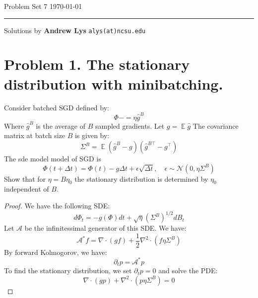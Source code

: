 \documentclass{amsart}
\newcommand{\cA}{\mathcal{A}}
\newcommand{\cN}{\mathcal{N}}
\DeclareMathOperator{\ee}{\mathbb{E}}
\theoremstyle{definition}
\begin{document}
\noindent
Problem Set 7  \hfill \today  %
\smallskip
\hrule
\smallskip
\noindent
Solutions by {\bf Andrew Lys} \qquad   %
  {\tt alys(at)ncsu.edu}

\vspace{0.5cm}

\section*{Problem 1. The stationary distribution with minibatching.}
Consider batched SGD defined by:
\[
\Phi -= \eta \hat{g}^B
\]
Where $\hat{g}^B$ is the average of $B$ sampled gradients. 
Let $g = \ee{\hat{g}}$
The covariance matrix at batch size $B$ is given by:
\[
\Sigma^B = \ee{(\hat{g}^B - g)(\hat{g}^{B\top} - g^\top)}
\]
The sde model model of SGD is 
\[
\Phi(t + \Delta t) = \Phi(t) - g\Delta t + \epsilon \sqrt{\Delta t}, \quad \epsilon \sim \cN(0, \eta \Sigma^B)
\]
Show that for $\eta = B \eta_0$ the stationary distribution is determined by $\eta_0$ independent of $B$. 
\begin{proof}
We have the following SDE:
\[
d \Phi_t = - g(\Phi) d t + \sqrt{\eta} (\Sigma^B)^{1/2} d B_t
\]
Let $\cA$ be the infinitessimal generator of this SDE. 
We have:
\[
\cA^\ast f =  \nabla \cdot (g f) + \frac12 \nabla^2 \cdot (f \eta\Sigma^B)
\]
By forward Kolmogorov, we have:
\[
\partial_t p = \cA^\ast p 
\]
To find the stationary distribution, we set $\partial_t p = 0$ and solve the PDE:
\[
\nabla \cdot (g p) + \nabla^2 \cdot (p \eta\Sigma^B) = 0
\]
\end{proof}
\end{document}

